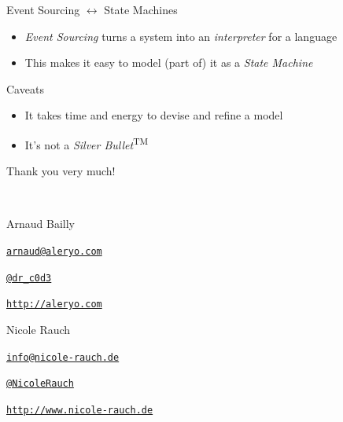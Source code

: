 \begin{frame}[fragile]{Event Sourcing $\leftrightarrow$ State Machines}
  \begin{itemize}[<+->]
  \item \emph{Event Sourcing} turns a system into an \emph{interpreter} for a language
  \item This makes it easy to model (part of) it as a \emph{State Machine}
  \end{itemize}
\end{frame}

\begin{frame}[fragile]{Caveats}
  \begin{itemize}
  \item It takes time and energy to devise and refine a model
  \item It's not a \emph{Silver Bullet}\textsuperscript{\tiny TM}
  \end{itemize}
\end{frame}


\begin{frame}{Thank you very much!}

  ~\\[1em]
  \begin{block}{Arnaud Bailly}
        \begin{description}[Twitterxx]
        \item[E-Mail]  \href{mailto:arnaud@aleryo.com}{\texttt{arnaud@aleryo.com}}
        \item[Twitter] \href{http://twitter.com/NicoleRauch}{\texttt{@dr\_c0d3}}
        \item[Web] \href{http://aleryo.com}{\texttt{http://aleryo.com}}
        \end{description}
  \end{block}
  \begin{block}{Nicole Rauch}
    \begin{description}[Twitterxx]
    \item[E-Mail]  \href{mailto:info@nicole-rauch.de}{\texttt{info@nicole-rauch.de}}
    \item[Twitter] \href{http://twitter.com/NicoleRauch}{\texttt{@NicoleRauch}}
    \item[Web] \href{http://www.nicole-rauch.de}{\texttt{http://www.nicole-rauch.de}}
    \end{description}
  \end{block}
\end{frame}

